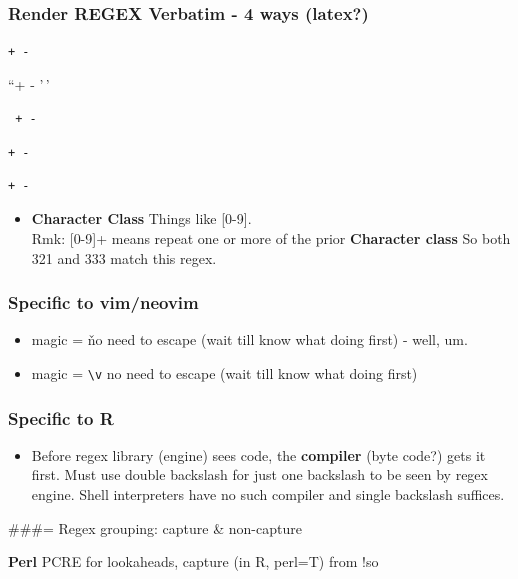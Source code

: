 \documentclass[
  letterpaper,
  DIV=11,
  numbers=noendperiod]{scrartcl}
\providecommand{\tightlist}{%
  \setlength{\itemsep}{0pt}\setlength{\parskip}{0pt}}\usepackage{longtable,booktabs,array}
\begin{document}
\subsubsection{Render REGEX Verbatim - 4 ways
(latex?)}\label{render-regex-verbatim---4-ways-latex}

\texttt{+\ -}

``+ - '\,'

\verb; + - ;

\verb;+ -;

\begin{verbatim} 
+ - 
\end{verbatim}

\begin{itemize}
\tightlist
\item
  \textbf{Character Class} Things like {[}0-9{]}.\\
  Rmk: {[}0-9{]}+ means repeat one or more of the prior
  \textbf{Character class} So both 321 and 333 match this regex.
\end{itemize}

\subsubsection{Specific to vim/neovim}\label{specific-to-vimneovim}

\begin{itemize}
\item
  magic = \v no need to escape (wait till know what doing first) - well,
  um.
\item
  magic = \texttt{\textbackslash{}v} no need to escape (wait till know
  what doing first)
\end{itemize}

\subsubsection{Specific to R}\label{specific-to-r}

\begin{itemize}
\tightlist
\item
  Before regex library (engine) sees code, the \textbf{compiler} (byte
  code?) gets it first. Must use double backslash for just one backslash
  to be seen by regex engine. Shell interpreters have no such compiler
  and single backslash suffices.
\end{itemize}

\#\#\#= Regex grouping: capture \& non-capture

\textbf{Perl} PCRE for lookaheads, capture (in R, perl=T) from !so
\end{document}

